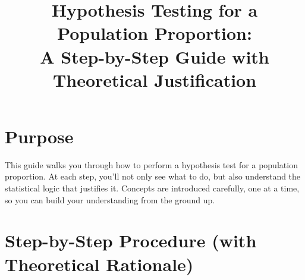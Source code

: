 \documentclass[11pt]{article}
\title{Hypothesis Testing for a Population Proportion:\\ A Step-by-Step Guide with Theoretical Justification}
\author{}
\date{}
\begin{document}
\maketitle

\section*{Purpose}

This guide walks you through how to perform a hypothesis test for a population proportion. At each step, you'll not only see what to do, but also understand the statistical logic that justifies it. Concepts are introduced carefully, one at a time, so you can build your understanding from the ground up.

\section*{Step-by-Step Procedure (with Theoretical Rationale)}
\end{document}
